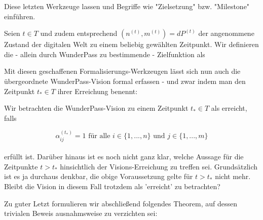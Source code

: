 \vspace{0.3cm}

Diese letzten Werkzeuge lassen und Begriffe wie "Zielsetzung" bzw. "Milestone" einführen.

\vspace{0.3cm}

\begin{Def}\label{defZiel}

Seien $t \in T$ und zudem entsprechend $(n^{(t)}, m^{(t)}) = dP^{(t)}$ der angenommene Zustand der digitalen Welt zu einem beliebig gewählten Zeitpunkt. Wir definieren die - allein durch WunderPass zu bestimmende - Zielfunktion als

\end{Def}








\vspace{1cm}


Mit diesen geschaffenen Formalisierungs-Werkzeugen lässt sich nun auch die übergeordnete WunderPass-Vision formal erfassen - und zwar indem man den Zeitpunkt $t_{*} \in T$ ihrer Erreichung benennt:

\begin{Def}\label{defVision}

Wir betrachten die WunderPass-Vision zu einem Zeitpunkt $t_{*} \in T$ als erreicht, falls

\vspace{0.3cm}

\begin{equation}
\label{eq:1}
  \alpha^{(t_{*})}_{ij} = 1 \textrm{ für alle } i \in \{1,...,n\} \textrm{ und } j \in \{1,...,m\}
\end{equation}\\
erfüllt ist. Darüber hinaus ist es noch nicht ganz klar, welche Aussage für die Zeitpunkte $t > t_{*}$ hinsichtlich der Visions-Erreichung zu treffen sei. Grundsätzlich ist es ja durchaus denkbar, die obige Voraussetzung gelte für $t > t_{*}$ nicht mehr. Bleibt die Vision in diesem Fall trotzdem als 'erreicht' zu betrachten?

\end{Def}

\vspace{1cm}

Zu guter Letzt formulieren wir abschließend folgendes Theorem, auf dessen trivialen Beweis ausnahmsweise zu verzichten sei:

